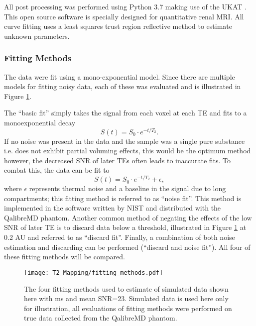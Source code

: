 All post processing was performed using Python 3.7 making use of the \ac{UKAT} \cite{daniel_ukrin_2021, nery_ukrin_2020}. This open source software is specially designed for quantitative renal \ac{MRI}. All curve fitting uses a least squares trust region reflective method to estimate unknown parameters.

\subsubsection{\ttwo Fitting Methods}

The data were fit using a mono-exponential model. Since there are multiple models for fitting noisy data, each of these was evaluated and is illustrated in Figure \ref{fig:t2_fitting_methods}. 

The ``basic fit'' simply takes the signal from each voxel at each \ac{TE} and fits to a monoexponential decay 
\begin{equation}
	S(t) = S_0 \cdot e^{-t/T_2}.
	\label{eq:t2}
\end{equation}
If no noise was present in the data and the sample was a single pure substance i.e. does not exhibit partial voluming effects, this would be the optimum method however, the decreased \ac{SNR} of later \acp{TE} often leads to inaccurate fits. To combat this, the data can be fit to
\begin{equation}
	S(t) = S_0 \cdot e^{-t/T_2} + \epsilon,
	\label{eq:t2_noise}
\end{equation}
where $\epsilon$ represents thermal noise and a baseline in the signal due to long \ttwo compartments; this fitting method is referred to as ``noise fit''. This method is implemented in the software written by \ac{NIST} and distributed with the QalibreMD phantom. Another common method of negating the effects of the low \ac{SNR} of later \ac{TE} is to discard data below a threshold, illustrated in Figure \ref{fig:t2_fitting_methods} at 0.2 AU and referred to as ``discard fit''. Finally, a combination of both noise estimation and discarding can be performed (``discard and noise fit''). All four of these fitting methods will be compared.

\begin{figure}[H]
	\centering
	\texttt{[image: T2\_Mapping/fitting\_methods.pdf]}
	\caption{The four fitting methods used to estimate \ttwo of simulated data shown here with  ms and mean \ac{SNR}=23. Simulated data is used here only for illustration, all evaluations of fitting methods were performed on true data collected from the QalibreMD phantom.}
	\label{fig:t2_fitting_methods}	
\end{figure}

